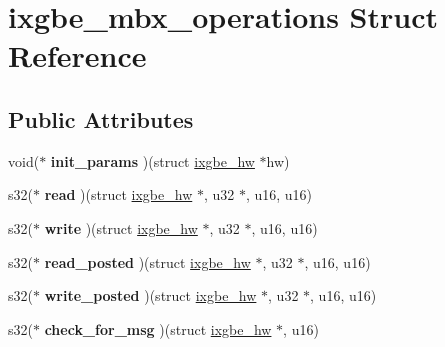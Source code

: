 \hypertarget{structixgbe__mbx__operations}{
\section{ixgbe\_\-mbx\_\-operations Struct Reference}
\label{structixgbe__mbx__operations}
}
\subsection*{Public Attributes}
\begin{DoxyCompactItemize}
\item 
\hypertarget{structixgbe__mbx__operations_a7b061e45b6e56abacfee34c3e31aabe0}{
void($\ast$ {\bfseries init\_\-params} )(struct \hyperlink{structixgbe__hw}{ixgbe\_\-hw} $\ast$hw)}
\label{structixgbe__mbx__operations_a7b061e45b6e56abacfee34c3e31aabe0}

\item 
\hypertarget{structixgbe__mbx__operations_a1ca6702248472cc08fb44f8d6dd9ca11}{
s32($\ast$ {\bfseries read} )(struct \hyperlink{structixgbe__hw}{ixgbe\_\-hw} $\ast$, u32 $\ast$, u16, u16)}
\label{structixgbe__mbx__operations_a1ca6702248472cc08fb44f8d6dd9ca11}

\item 
\hypertarget{structixgbe__mbx__operations_aa5c2f78594f795cdd7202897ceb7e48a}{
s32($\ast$ {\bfseries write} )(struct \hyperlink{structixgbe__hw}{ixgbe\_\-hw} $\ast$, u32 $\ast$, u16, u16)}
\label{structixgbe__mbx__operations_aa5c2f78594f795cdd7202897ceb7e48a}

\item 
\hypertarget{structixgbe__mbx__operations_a9dddcca86eab959f3c04ecb425e9f11a}{
s32($\ast$ {\bfseries read\_\-posted} )(struct \hyperlink{structixgbe__hw}{ixgbe\_\-hw} $\ast$, u32 $\ast$, u16, u16)}
\label{structixgbe__mbx__operations_a9dddcca86eab959f3c04ecb425e9f11a}

\item 
\hypertarget{structixgbe__mbx__operations_a6130876f4b008500ffca1c2e9642489c}{
s32($\ast$ {\bfseries write\_\-posted} )(struct \hyperlink{structixgbe__hw}{ixgbe\_\-hw} $\ast$, u32 $\ast$, u16, u16)}
\label{structixgbe__mbx__operations_a6130876f4b008500ffca1c2e9642489c}

\item 
\hypertarget{structixgbe__mbx__operations_a02bf200e4adb5859d500449e04b75553}{
s32($\ast$ {\bfseries check\_\-for\_\-msg} )(struct \hyperlink{structixgbe__hw}{ixgbe\_\-hw} $\ast$, u16)}
\label{structixgbe__mbx__operations_a02bf200e4adb5859d500449e04b75553}


\end{DoxyCompactItemize}
